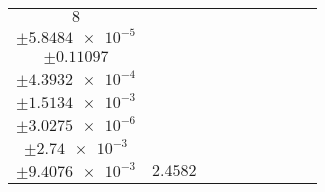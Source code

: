 \documentclass[8pt]{article}
\begin{document}
\begin{longtable}[l]{c c c c c c c c c}
$\num{8}$ & \begin{tabular}[c]{@{}c@{}}$\num{3.0484e-2}$ \\ $\pm\num{5.8484e-5}$\end{tabular} & \begin{tabular}[c]{@{}c@{}}$\num{0.9142}$ \\ $\pm\num{0.11097}$\end{tabular} & \begin{tabular}[c]{@{}c@{}}$\num{11.395}$ \\ $\pm\num{4.3932e-4}$\end{tabular} & \begin{tabular}[c]{@{}c@{}}$\num{1.1911e+3}$ \\ $\pm\num{1.5134e-3}$\end{tabular} & \begin{tabular}[c]{@{}c@{}}$\num{2.3828}$ \\ $\pm\num{3.0275e-6}$\end{tabular} & \begin{tabular}[c]{@{}c@{}}$\num{1.1722}$ \\ $\pm\num{2.74e-3}$\end{tabular} & \begin{tabular}[c]{@{}c@{}}$\num{4.2253}$ \\ $\pm\num{9.4076e-3}$\end{tabular} & $\num{2.4582}$\\
\bottomrule
\end{longtable}
\end{document}
